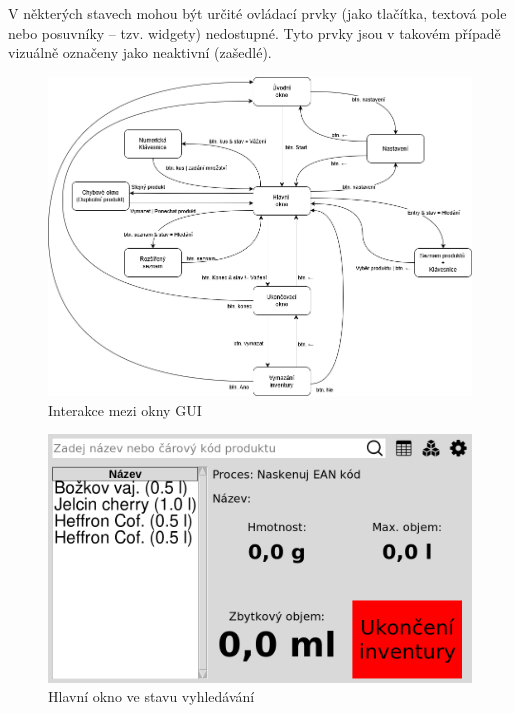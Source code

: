 
V některých stavech mohou být určité ovládací prvky (jako tlačítka, textová pole nebo posuvníky – tzv. widgety) nedostupné. Tyto prvky jsou v takovém případě vizuálně označeny jako neaktivní (zašedlé).

\begin{figure}[!h]
    \begin{center}
        \includegraphics[scale=0.5]{obrazky/Interakce napříč okny GUI.png}
    \end{center}
    \caption{Interakce mezi okny GUI}
    \label{Interakce mezi okny GUI}
\end{figure}

\begin{figure}[H]
    \begin{center}
        \includegraphics[scale=0.4]{obrazky/GUI Vyhledávání.png}
    \end{center}
    \caption{Hlavní okno ve stavu vyhledávání}
    \label{Interakce mezi okny GUI}
\end{figure}


